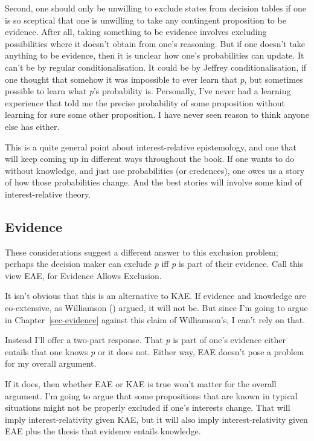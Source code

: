 \documentclass[
  12pt,
  letterpaper,
]{scrbook}
\begin{document}
Second, one should only be unwilling to exclude states from decision
tables if one is so sceptical that one is unwilling to take any
contingent proposition to be evidence. After all, taking something to be
evidence involves excluding possibilities where it doesn't obtain from
one's reasoning. But if one doesn't take anything to be evidence, then
it is unclear how one's probabilities can update. It can't be by regular
conditionalisation. It could be by Jeffrey conditionalisation, if one
thought that somehow it was impossible to ever learn that \emph{p}, but
sometimes possible to learn what \emph{p}'s probability is. Personally,
I've never had a learning experience that told me the precise
probability of some proposition without learning for sure some other
proposition. I have never seen reason to think anyone else has either.

This is a quite general point about interest-relative epistemology, and
one that will keep coming up in different ways throughout the book. If
one wants to do without knowledge, and just use probabilities (or
credences), one owes us a story of how those probabilities change. And
the best stories will involve some kind of interest-relative theory.

\subsection{Evidence}\label{sec-kae-evidence}

These considerations suggest a different answer to this exclusion
problem; perhaps the decision maker can exclude \emph{p} iff \emph{p} is
part of their evidence. Call this view EAE, for Evidence Allows
Exclusion.

It isn't obvious that this is an alternative to KAE. If evidence and
knowledge are co-extensive, as Williamson
() argued, it will not be. But since
I'm going to argue in Chapter~\ref{sec-evidence} against this claim of
Williamson's, I can't rely on that.

Instead I'll offer a two-part response. That \emph{p} is part of one's
evidence either entails that one knows \emph{p} or it does not. Either
way, EAE doesn't pose a problem for my overall argument.

If it does, then whether EAE or KAE is true won't matter for the overall
argument. I'm going to argue that some propositions that are known in
typical situations might not be properly excluded if one's interests
change. That will imply interest-relativity given KAE, but it will also
imply interest-relativity given EAE plus the thesis that evidence
entails knowledge.
\end{document}
